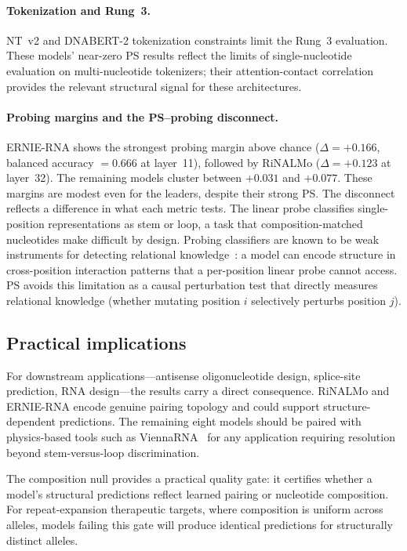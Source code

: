 \documentclass[11pt]{article}
\begin{document}
\paragraph{Tokenization and Rung~3.}
NT~v2 and DNABERT-2 tokenization constraints limit the Rung~3
evaluation. These models' near-zero PS results reflect the limits of
single-nucleotide evaluation on multi-nucleotide tokenizers; their
attention-contact correlation provides the relevant structural signal
for these architectures.

\paragraph{Probing margins and the PS--probing disconnect.}
ERNIE-RNA shows the strongest probing margin above chance
($\Delta = +0.166$, balanced accuracy $= 0.666$ at layer~11),
followed by RiNALMo ($\Delta = +0.123$ at layer~32). The remaining
models cluster between $+0.031$ and $+0.077$. These margins are
modest even for the leaders, despite their strong PS. The disconnect
reflects a difference in what each metric tests. The linear probe
classifies single-position representations as stem or loop, a task
that composition-matched nucleotides make difficult by design.
Probing classifiers are known to be weak instruments for detecting
relational knowledge~\citep{belinkov2022probing,hewitt2019control}:
a model can encode structure in cross-position interaction patterns
that a per-position linear probe cannot access. PS avoids this
limitation as a causal perturbation test that directly measures
relational knowledge (whether mutating position $i$ selectively
perturbs position $j$).

\subsection{Practical implications}

For downstream applications---antisense oligonucleotide design,
splice-site prediction, RNA design---the results carry a direct
consequence. RiNALMo and ERNIE-RNA encode genuine pairing topology
and could support structure-dependent predictions. The remaining eight
models should be paired with physics-based tools such as
ViennaRNA~\citep{vienna2011} for any application requiring resolution
beyond stem-versus-loop discrimination.

The composition null provides a practical quality gate: it certifies
whether a model's structural predictions reflect learned pairing or
nucleotide composition. For repeat-expansion therapeutic targets,
where composition is uniform across alleles, models failing this gate
will produce identical predictions for structurally distinct alleles.
\end{document}
